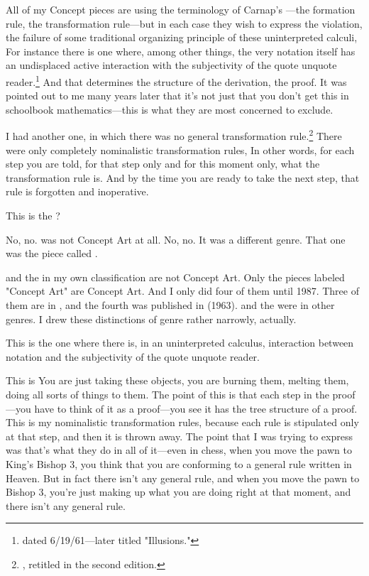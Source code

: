 All of my Concept pieces are using the terminology of Carnap's 
---the formation rule, the transformation 
rule---but in each case they wish to express the violation, the failure of 
some traditional organizing principle of these uninterpreted calculi, 
For instance there is one where, among other things, the very notation 
itself has an undisplaced active interaction with the subjectivity of the 
quote unquote reader.\footnote{dated 6/19/61---later titled "Illusions."} 
And that determines the structure of the derivation, the proof. 
It was pointed out to me many years later that it's not 
just that you don't get this in schoolbook mathematics---this is what 
they are most concerned to exclude. 

I had another one, in which there was no general transformation 
rule.\footnote{, retitled  in the second edition.}
There were only completely nominalistic transformation rules, 
In other words, for each step you are told, for that step only and for this 
moment only, what the transformation rule is. And by the time you are 
ready to take the next step, that rule is forgotten and inoperative. 

 This is the ? 

 No, no.  was not Concept Art at 
all. No, no. It was a different genre. That one was the piece called 
.

 and the  in my 
own classification are not Concept Art. Only the pieces labeled 
"Concept Art" are Concept Art. And I only did four of them until 1987. 
Three of them are in , and the fourth was published in 
 (1963).  and the 
 were in other genres. I drew these distinctions of genre 
rather narrowly, actually. 

This is the one  where there 
is, in an uninterpreted calculus, interaction between notation and the 
subjectivity of the quote unquote reader. 

This is  You are just taking these objects, you 
are burning them, melting them, doing all sorts of things to them. The 
point of this is that each step in the proof---you have to think of it as a 
proof---you see it has the tree structure of a proof. This is my nominalistic 
transformation rules, because each rule is stipulated only at that 
step, and then it is thrown away. The point that I was trying to express 
was that's what they do in all of it---even in chess, when you move the 
pawn to King's Bishop 3, you think that you are conforming to a 
general rule written in Heaven. But in fact there isn't any general rule, 
and when you move the pawn to Bishop 3, you're just making up what 
you are doing right at that moment, and there isn't any general rule. 


